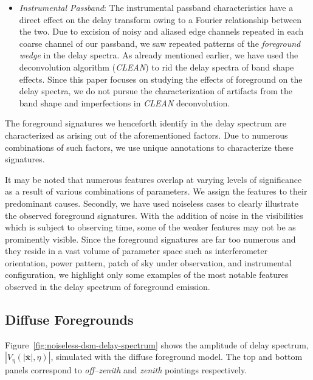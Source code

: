 \documentclass[preprint2,iop,numberedappendix]{emulateapj}
\begin{document}
\begin{itemize}
\item {\it Instrumental Passband}: The instrumental passband characteristics have a direct effect on the delay transform owing to a Fourier relationship between the two. Due to excision of noisy and aliased edge channels repeated in each coarse channel of our passband, we saw repeated patterns of the {\it foreground wedge} in the delay spectra. As already mentioned earlier, we have used the deconvolution algorithm ({\it CLEAN}) to rid the delay spectra of band shape effects. Since this paper focuses on studying the effects of foreground on the delay spectra, we do not pursue the characterization of artifacts from the band shape and imperfections in {\it CLEAN} deconvolution.

\end{itemize}

The foreground signatures we henceforth identify in the delay spectrum are characterized as arising out of the aforementioned factors. Due to numerous combinations of such factors, we use unique annotations to characterize these signatures.

It may be noted that numerous features overlap at varying levels of significance as a result of various combinations of parameters. We assign the features to their predominant causes. Secondly, we have used noiseless cases to clearly illustrate the observed foreground signatures. With the addition of noise in the visibilities which is subject to observing time, some of the weaker features may not be as prominently visible. Since the foreground signatures are far too numerous and they reside in a vast volume of parameter space such as interferometer orientation, power pattern, patch of sky under observation, and instrumental configuration, we highlight only some examples of the most notable features observed in the delay spectrum of foreground emission.

\subsection{Diffuse Foregrounds}\label{sec:diffuse}

Figure~\ref{fig:noiseless-dsm-delay-spectrum} shows the amplitude of delay spectrum, $|V_\eta(|\overline{\mathbf{x}}|,\eta)|$, simulated with the diffuse foreground model. The top and bottom panels correspond to {\it off--zenith} and {\it zenith} pointings respectively. 
\end{document}
